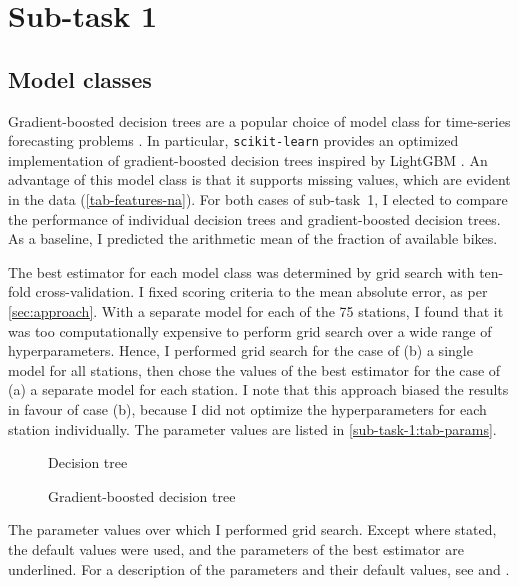 \section{Sub-task 1}
\label{sec:sub-task-1}

\subsection{Model classes}
\label{sec:sub-task-1:model-classes}

Gradient-boosted decision trees are a popular choice of model class for time-series
forecasting problems \parencite{Bojer2021}.
In particular, \texttt{scikit-learn} provides an optimized implementation of
gradient-boosted decision trees inspired by LightGBM \parencite{Ke2017}.
An advantage of this model class is that it supports missing values, which are evident
in the data (\cref{tab-features-na}).
For both cases of sub-task~1, I elected to compare the performance of individual
decision trees and gradient-boosted decision trees.
As a baseline, I predicted the arithmetic mean of the fraction of available bikes.

The best estimator for each model class was determined by grid search with ten-fold
cross-validation.
I fixed scoring criteria to the mean absolute error, as per \cref{sec:approach}.
With a separate model for each of the 75 stations, I found that it was too
computationally expensive to perform grid search over a wide range of hyperparameters.
Hence, I performed grid search for the case of (b) a single model for all stations,
then chose the values of the best estimator for the case of (a) a separate model for
each station.
I note that this approach biased the results in favour of case (b), because I did not
optimize the hyperparameters for each station individually.
The parameter values are listed in \cref{sub-task-1:tab-params}.

\begin{table}
	\centering
	\begin{subfigure}{\textwidth}
		\centering
		
		\caption{Decision tree}
		\label{sub-task-1:tab-params-decision-tree}
	\end{subfigure}
	\subfigurespace
	\begin{subfigure}{\textwidth}
		\centering
		
		\caption{Gradient-boosted decision tree}
		\label{sub-task-1:tab-params-gbdt}
	\end{subfigure}
	\caption{
		The parameter values over which I performed grid search.
		Except where stated, the default values were used, and the parameters of the best
		estimator are underlined.
		For a description of the parameters and their default values, see
		 and
		.
	}
	\label{sub-task-1:tab-params}
\end{table}

